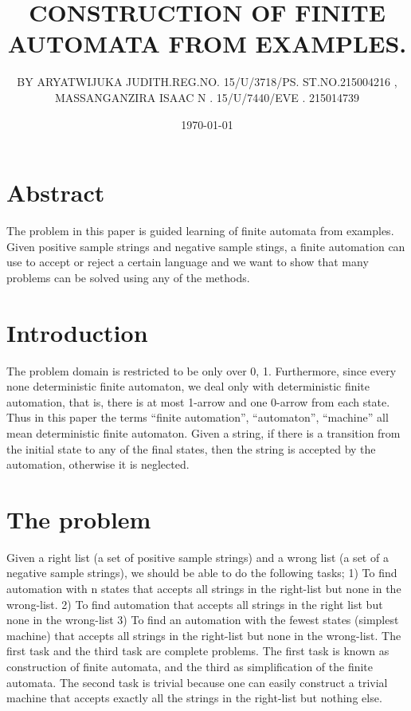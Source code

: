 \documentclass[14pt]{article}
\begin{document}
\title{CONSTRUCTION OF FINITE AUTOMATA FROM EXAMPLES.}

\author{BY ARYATWIJUKA JUDITH.REG.NO. 15/U/3718/PS. ST.NO.215004216 ,
             MASSANGANZIRA ISAAC N . 15/U/7440/EVE . 215014739}
\date{\today}

\section{Abstract}
The problem in this paper is guided learning of finite automata from examples. Given positive sample strings and negative sample stings, a finite automation can use to accept or reject a certain language and we want to show that many problems can be solved using any of the methods.
\section{Introduction}
The problem domain is restricted to be only over {0, 1}. Furthermore, since every none deterministic finite automaton, we deal only with deterministic finite automation, that is, there is at most 1-arrow and one 0-arrow from each state. Thus in this paper the terms “finite automation”, “automaton”, “machine” all mean deterministic finite automaton.
 Given a string, if there is a transition from the initial state to any of the final states, then the string is accepted by the automation, otherwise it is neglected.

\section{The problem}
Given a right list (a set of positive sample strings) and a wrong list (a set of a negative sample strings), we should be able to do the following tasks;
1)	To find automation with n states that accepts all strings in the right-list but none in the wrong-list.
2)	To find automation that accepts all strings in the right list but none in the wrong-list
3)	To find an automation with the fewest states (simplest machine) that accepts all strings in the right-list but none in the wrong-list.
The first task and the third task are complete problems. The first task is known as construction of finite automata, and the third as simplification of the finite automata.
The second task is trivial because one can easily construct a trivial machine that accepts exactly all the strings in the right-list but nothing else.
\end{document}
